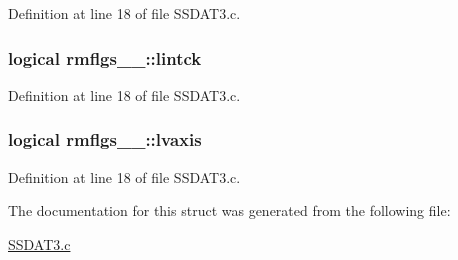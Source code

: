 Definition at line 18 of file S\+S\+D\+A\+T3.\+c.

\subsubsection[{\texorpdfstring{lintck}{lintck}}]{\setlength{\rightskip}{0pt plus 5cm}logical rmflgs\+\_\+\_\+\+::lintck}\hypertarget{structrmflgs__1___a174bc032f247872151ec05bc3e5f1cb3}{}\label{structrmflgs__1___a174bc032f247872151ec05bc3e5f1cb3}


Definition at line 18 of file S\+S\+D\+A\+T3.\+c.

\subsubsection[{\texorpdfstring{lvaxis}{lvaxis}}]{\setlength{\rightskip}{0pt plus 5cm}logical rmflgs\+\_\+\_\+\+::lvaxis}\hypertarget{structrmflgs__1___ada293317df93347fa629e11366dfa21d}{}\label{structrmflgs__1___ada293317df93347fa629e11366dfa21d}


Definition at line 18 of file S\+S\+D\+A\+T3.\+c.



The documentation for this struct was generated from the following file\+:\begin{DoxyCompactItemize}
\item 
\hyperlink{SSDAT3_8c}{S\+S\+D\+A\+T3.\+c}\end{DoxyCompactItemize}

